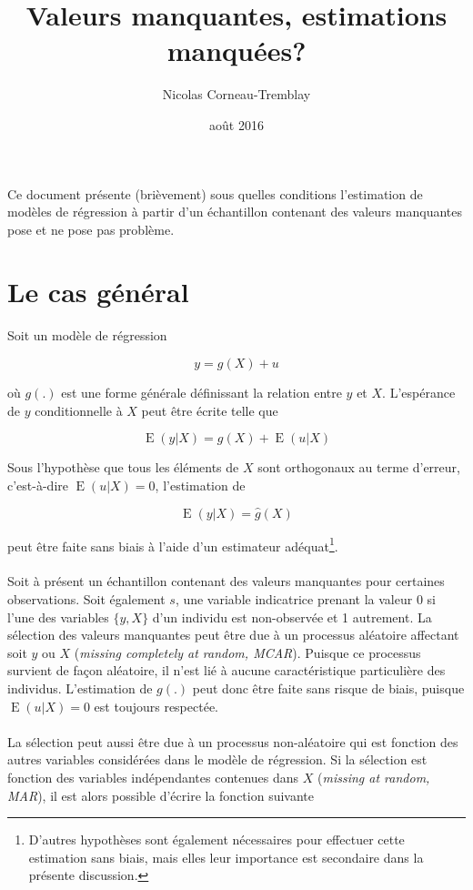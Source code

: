 \documentclass{article}
\title{Valeurs manquantes, estimations manqu\'{e}es?}
\author{Nicolas Corneau-Tremblay}
\date{ao\^{u}t 2016}
\DeclareMathOperator{\esp}{E}
\begin{document}
\maketitle

Ce document pr\'{e}sente (bri\`{e}vement) sous quelles conditions l'estimation de mod\`{e}les de r\'{e}gression \`{a} partir d'un \'{e}chantillon contenant des valeurs manquantes pose et ne pose pas  probl\`{e}me.

\section{Le cas g\'{e}n\'{e}ral}
Soit un mod\`{e}le de r\'{e}gression 

\[y=g(X)+u\]

o\`{u} $g(.)$ est une forme g\'{e}n\'{e}rale d\'{e}finissant la relation entre $y$ et $X$. L'esp\'{e}rance de $y$ conditionnelle \`{a} $X$ peut \^{e}tre \'{e}crite telle que

\[\esp(y|X)=g(X)+\esp(u|X)\]

Sous l'hypoth\`{e}se  que tous les \'{e}l\'{e}ments de $X$ sont orthogonaux au terme d'erreur, c'est-\`a-dire $\esp(u|X)=0$, l'estimation de

\[\esp(y|X)=\hat{g}(X)\]

peut \^{e}tre faite sans biais \`{a} l'aide d'un estimateur ad\'{equat}\footnote{D'autres hypoth\`{e}ses sont \'{e}galement n\'{e}cessaires pour effectuer cette estimation sans biais, mais elles leur importance est secondaire dans la pr\'{e}sente discussion.}. 
\\
\\
Soit \`{a} pr\'{e}sent un \'{e}chantillon contenant des valeurs manquantes pour certaines observations. Soit \'{e}galement $s$, une variable indicatrice prenant la valeur 0 si l'une des variables $\{y,X\}$ d'un individu est non-observ\'{e}e et 1 autrement. La s\'{e}lection des valeurs manquantes peut \^{e}tre due \`{a} un processus al\'{e}atoire affectant  soit $y$ ou $X$ (\textit{missing completely at random, MCAR}). Puisque ce processus survient de fa\c{c}on  al\'{e}atoire, il n'est li\'{e} \`{a} aucune caract\'{e}ristique particuli\`ere des individus. L'estimation de $g(.)$ peut donc \^{e}tre faite sans risque de biais, puisque $\esp(u|X)=0$ est toujours respect\'{e}e.
\\
\\
La s\'{e}lection peut aussi \^{e}tre due \`{a} un processus non-al\'{e}atoire qui est fonction des autres variables consid\'{e}r\'{e}es dans le mod\`{e}le de r\'{e}gression. Si la s\'{e}lection est fonction des variables ind\'{e}pendantes contenues dans $X$ (\textit{missing at random, MAR}), il est alors possible d'\'{e}crire la fonction suivante
\end{document}
